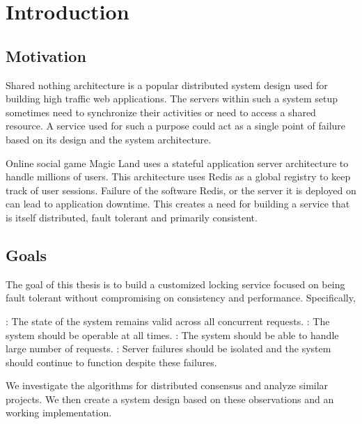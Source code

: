 \chapter{Introduction}
\label{chapter:introduction}

\section{Motivation}

Shared nothing architecture%
 \citep{Stonebraker86g} is a popular distributed system design used for
building high traffic web applications. The servers within such a system setup
sometimes need to synchronize their activities or need to access a shared
resource. A service used for such a purpose could act as a single point of
failure based on its design and the system architecture.

Online social game Magic Land uses a stateful application server architecture to
handle millions of users. This architecture uses Redis as a global registry to
keep track of user sessions. Failure of the software Redis, or the server it
is deployed on can lead to application downtime. This creates a need for
building a service that is itself distributed, fault tolerant and primarily
consistent.

\section{Goals}

The goal of this thesis is to build a customized locking service focused on
being fault tolerant without compromising on consistency and performance.
Specifically,

\begin{itemize}
    : The state of the system remains valid across
    all concurrent requests.
    : The system should be operable at all times.
    : The system should be able to handle large number of
    requests.
    : Server failures should be isolated and the system
    should continue to function despite these failures.
\end{itemize}

We investigate the algorithms for distributed consensus and analyze similar
projects. We then create a system design based on these observations and
an working implementation.

